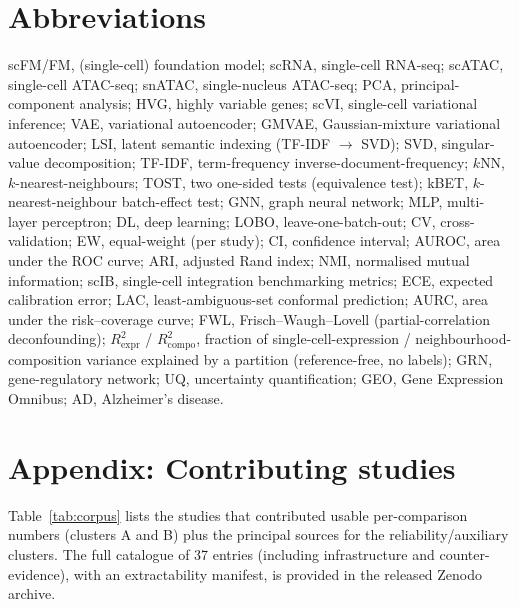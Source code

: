 \documentclass[11pt]{article}
\begin{document}
\section*{Abbreviations}
{\footnotesize\noindent scFM/FM, (single-cell) foundation model; scRNA, single-cell RNA-seq; scATAC, single-cell ATAC-seq; snATAC, single-nucleus ATAC-seq; PCA, principal-component analysis; HVG, highly variable genes; scVI, single-cell variational inference; VAE, variational autoencoder; GMVAE, Gaussian-mixture variational autoencoder; LSI, latent semantic indexing (TF-IDF $\to$ SVD); SVD, singular-value decomposition; TF-IDF, term-frequency inverse-document-frequency; $k$NN, $k$-nearest-neighbours; TOST, two one-sided tests (equivalence test); kBET, $k$-nearest-neighbour batch-effect test; GNN, graph neural network; MLP, multi-layer perceptron; DL, deep learning; LOBO, leave-one-batch-out; CV, cross-validation; EW, equal-weight (per study); CI, confidence interval; AUROC, area under the ROC curve; ARI, adjusted Rand index; NMI, normalised mutual information; scIB, single-cell integration benchmarking metrics; ECE, expected calibration error; LAC, least-ambiguous-set conformal prediction; AURC, area under the risk--coverage curve; FWL, Frisch--Waugh--Lovell (partial-correlation deconfounding); $R^2_{\mathrm{expr}}$ / $R^2_{\mathrm{compo}}$, fraction of single-cell-expression / neighbourhood-composition variance explained by a partition (reference-free, no labels); GRN, gene-regulatory network; UQ, uncertainty quantification; GEO, Gene Expression Omnibus; AD, Alzheimer's disease.\par}

\appendix
\renewcommand{\thetable}{A\arabic{table}}
\setcounter{table}{0}
\section*{Appendix: Contributing studies}
Table~\ref{tab:corpus} lists the studies that contributed usable per-comparison numbers (clusters A and B) plus the principal sources for the reliability/auxiliary clusters. The full catalogue of 37 entries (including infrastructure and counter-evidence), with an extractability manifest, is provided in the released Zenodo archive.
\end{document}
